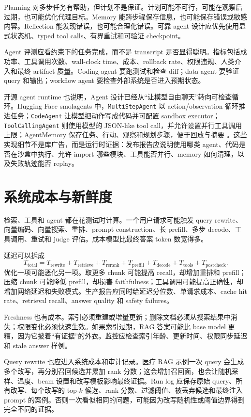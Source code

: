 \documentclass[UTF8,zihao=-4,openany]{ctexbook}
\begin{document}
Planning 对多步任务有帮助，但计划不是保证。计划可能不可行，可能在观察后过期，也可能优化代理目标。Memory 能跨步骤保存信息，也可能保存错误或敏感内容。Reflection 能发现错误，也可能合理化错误。可靠 agent 设计应优先使用显式状态机、typed tool calls、有界重试和可验证 checkpoint。

Agent 评测应看约束下的任务完成，而不是 transcript 是否显得聪明。指标包括成功率、工具调用次数、wall-clock time、成本、rollback rate、权限违规、人类介入和最终 artifact 质量。Coding agent 要跑测试和检查 diff；data agent 要验证 query 和输出；workflow agent 要检查外部系统是否进入预期状态。

开源 agent runtime 也说明，Agent 设计已经从“让模型自由聊天”转向可检查循环。Hugging Face smolagents 中，\texttt{MultiStepAgent} 以 action/observation 循环推进任务；\texttt{CodeAgent} 让模型把动作写成代码并可配置 sandbox executor；\texttt{ToolCallingAgent} 则使用模型的 JSON-like tool call，并允许设置并行工具调用上限；AgentMemory 保存任务、行动、观察和规划步骤，便于回放与摘要 \cite{huggingface2026smolagents,huggingface2026smolagentsagents}。这些实现细节不是库广告，而是运行时证据：发布报告应说明使用哪类 agent、代码是否在沙盒中执行、允许 import 哪些模块、工具能否并行、memory 如何清理，以及失败轨迹能否 replay。

\section{系统成本与新鲜度}
检索、工具和 agent 都在花测试时计算。一个用户请求可能触发 query rewrite、向量编码、向量搜索、重排、prompt construction、长 prefill、多步 decode、工具调用、重试和 judge 评估。成本模型比最终答案 token 数宽得多。

延迟可以拆成
\[
  T_{\mathrm{total}} =
  T_{\mathrm{rewrite}} + T_{\mathrm{retrieve}} + T_{\mathrm{rerank}} +
  T_{\mathrm{prefill}} + T_{\mathrm{decode}} + T_{\mathrm{tools}} +
  T_{\mathrm{postcheck}} .
\]
优化一项可能恶化另一项。取更多 chunk 可能提高 recall，却增加重排和 prefill；压缩 chunk 可能降低 prefill，却损害 faithfulness；工具调用可能提高正确性，却增加网络延迟和失败模式。生产报告应同时给延迟分位数、单请求成本、cache hit rate、retrieval recall、answer quality 和 safety failures。

Freshness 也有成本。索引必须重建或增量更新；删除文档必须从搜索结果中消失；权限变化必须快速生效。如果索引过期，RAG 答案可能比 base model 更糟，因为它披着“有证据”的外衣。监控应检查索引年龄、更新时间、权限同步延迟和 stale answer 样例。

Query rewrite 也应进入系统成本和审计记录。医疗 RAG 示例一次 query 会生成多个改写，再分别召回候选并累加 rank 分数；这会增加召回面，也会让随机采样、温度、beam 设置和改写模板影响最终证据。Run log 应保存原始 query、所有改写、每个改写的 top-$k$ 候选、rank 分数、过滤阈值、被丢弃候选和最终注入 prompt 的案例。否则一次看似相同的问题，可能因为改写随机性或阈值边界得到完全不同的证据。
\end{document}
